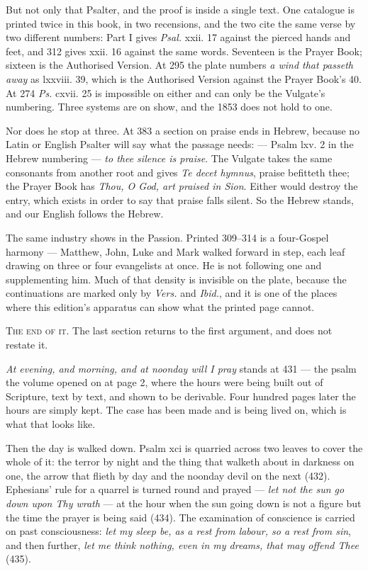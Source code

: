 But not only that Psalter, and the proof is inside a single text. One catalogue is
printed twice in this book, in two recensions, and the two cite the same verse by
two different numbers: Part I gives \emph{Psal.} xxii. 17 against the pierced hands
and feet, and 312 gives xxii. 16 against the same words. Seventeen is the Prayer
Book; sixteen is the Authorised Version. At 295 the plate numbers \emph{a wind that
passeth away} as lxxviii. 39, which is the Authorised Version against the Prayer
Book's 40. At 274 \emph{Ps.} cxvii. 25 is impossible on either and can only be the
Vulgate's numbering. Three systems are on show, and the 1853 does not hold to one.

Nor does he stop at three. At 383 a section on praise ends in Hebrew, because no
Latin or English Psalter will say what the passage needs:  ---
Psalm lxv. 2 in the Hebrew numbering --- \emph{to thee silence is praise}. The
Vulgate takes the same consonants from another root and gives \emph{Te decet
hymnus}, praise befitteth thee; the Prayer Book has \emph{Thou, O God, art praised
in Sion}. Either would destroy the entry, which exists in order to say that praise
falls silent. So the Hebrew stands, and our English follows the Hebrew.

The same industry shows in the Passion. Printed 309--314 is a four-Gospel harmony
--- Matthew, John, Luke and Mark walked forward in step, each leaf drawing on three
or four evangelists at once. He is not following one and supplementing him. Much of
that density is invisible on the plate, because the continuations are marked only
by \emph{Vers.} and \emph{Ibid.}, and it is one of the places where this edition's
apparatus can show what the printed page cannot.

\vspace{0.8\baselineskip}
{\scshape The end of it.}\quad
The last section returns to the first argument, and does not restate it.

\emph{At evening, and morning, and at noonday will I pray} stands at 431 --- the
psalm the volume opened on at page 2, where the hours were being built out of
Scripture, text by text, and shown to be derivable. Four hundred pages later the
hours are simply kept. The case has been made and is being lived on, which is what
that looks like.

Then the day is walked down. Psalm xci is quarried across two leaves to cover the
whole of it: the terror by night and the thing that walketh about in darkness on
one, the arrow that flieth by day and the noonday devil on the next (432).
Ephesians' rule for a quarrel is turned round and prayed --- \emph{let not the sun
go down upon Thy wrath} --- at the hour when the sun going down is not a figure but
the time the prayer is being said (434). The examination of conscience is carried
on past consciousness: \emph{let my sleep be, as a rest from labour, so a rest from
sin}, and then further, \emph{let me think nothing, even in my dreams, that may
offend Thee} (435).

